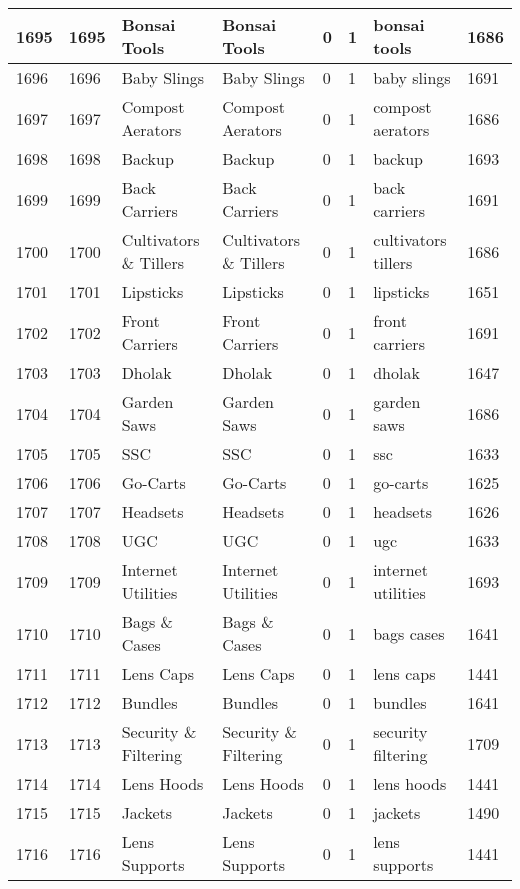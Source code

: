 \begin{longtable}{|l|l|l|l|l|l|l|l|}
1695 & 1695 & Bonsai Tools & Bonsai Tools & 0 & 1 & bonsai tools & 1686 \\ \hline 
1696 & 1696 & Baby Slings & Baby Slings & 0 & 1 & baby slings & 1691 \\ \hline 
1697 & 1697 & Compost Aerators & Compost Aerators & 0 & 1 & compost aerators & 1686 \\ \hline 
1698 & 1698 & Backup & Backup & 0 & 1 & backup & 1693 \\ \hline 
1699 & 1699 & Back Carriers & Back Carriers & 0 & 1 & back carriers & 1691 \\ \hline 
1700 & 1700 & Cultivators \& Tillers & Cultivators \& Tillers & 0 & 1 & cultivators tillers & 1686 \\ \hline 
1701 & 1701 & Lipsticks & Lipsticks & 0 & 1 & lipsticks & 1651 \\ \hline 
1702 & 1702 & Front Carriers & Front Carriers & 0 & 1 & front carriers & 1691 \\ \hline 
1703 & 1703 & Dholak & Dholak & 0 & 1 & dholak & 1647 \\ \hline 
1704 & 1704 & Garden Saws & Garden Saws & 0 & 1 & garden saws & 1686 \\ \hline 
1705 & 1705 & SSC & SSC & 0 & 1 & ssc & 1633 \\ \hline 
1706 & 1706 & Go-Carts & Go-Carts & 0 & 1 & go-carts & 1625 \\ \hline 
1707 & 1707 & Headsets & Headsets & 0 & 1 & headsets & 1626 \\ \hline 
1708 & 1708 & UGC & UGC & 0 & 1 & ugc & 1633 \\ \hline 
1709 & 1709 & Internet Utilities & Internet Utilities & 0 & 1 & internet utilities & 1693 \\ \hline 
1710 & 1710 & Bags \& Cases & Bags \& Cases & 0 & 1 & bags cases & 1641 \\ \hline 
1711 & 1711 & Lens Caps & Lens Caps & 0 & 1 & lens caps & 1441 \\ \hline 
1712 & 1712 & Bundles & Bundles & 0 & 1 & bundles & 1641 \\ \hline 
1713 & 1713 & Security \& Filtering & Security \& Filtering & 0 & 1 & security filtering & 1709 \\ \hline 
1714 & 1714 & Lens Hoods & Lens Hoods & 0 & 1 & lens hoods & 1441 \\ \hline 
1715 & 1715 & Jackets & Jackets & 0 & 1 & jackets & 1490 \\ \hline 
1716 & 1716 & Lens Supports & Lens Supports & 0 & 1 & lens supports & 1441 \\ \hline 

\end{longtable}
